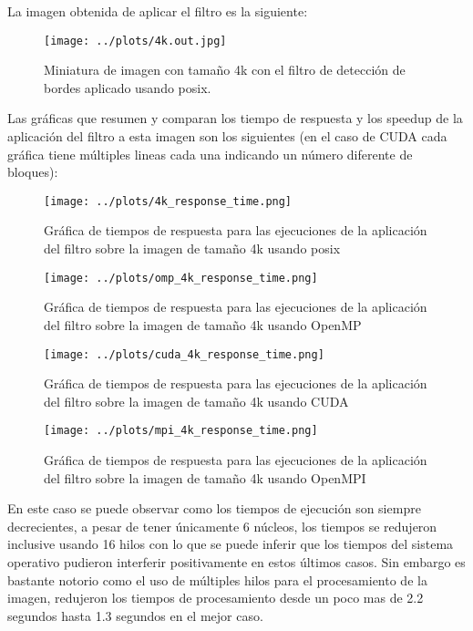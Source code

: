La imagen obtenida de aplicar el filtro es la siguiente:

\begin{figure}[H]
    \centering
    \texttt{[image: ../plots/4k.out.jpg]}
    \caption{Miniatura de imagen con tamaño 4k con el filtro de detección de bordes aplicado usando posix.}
\end{figure}

Las gráficas que resumen y comparan los tiempo de respuesta y los speedup de la aplicación del filtro a esta imagen son los siguientes (en el caso de CUDA cada gráfica tiene múltiples lineas cada una indicando un número diferente de bloques):

\begin{figure}[H]
    \centering
    \texttt{[image: ../plots/4k\_response\_time.png]}
    \caption{Gráfica de tiempos de respuesta para las ejecuciones de la aplicación del filtro sobre la imagen de tamaño 4k usando posix}
\end{figure}

\begin{figure}[H]
    \centering
    \texttt{[image: ../plots/omp\_4k\_response\_time.png]}
    \caption{Gráfica de tiempos de respuesta para las ejecuciones de la aplicación del filtro sobre la imagen de tamaño 4k usando OpenMP}
\end{figure}

\begin{figure}[H]
    \centering
    \texttt{[image: ../plots/cuda\_4k\_response\_time.png]}
    \caption{Gráfica de tiempos de respuesta para las ejecuciones de la aplicación del filtro sobre la imagen de tamaño 4k usando CUDA}
\end{figure}

\begin{figure}[H]
    \centering
    \texttt{[image: ../plots/mpi\_4k\_response\_time.png]}
    \caption{Gráfica de tiempos de respuesta para las ejecuciones de la aplicación del filtro sobre la imagen de tamaño 4k usando OpenMPI}
\end{figure}

En este caso se puede observar como los tiempos de ejecución son siempre decrecientes, a pesar de tener únicamente 6 núcleos, los tiempos se redujeron inclusive usando 16 hilos con lo que se puede inferir que los tiempos del sistema operativo pudieron interferir positivamente en estos últimos casos. Sin embargo es bastante notorio como el uso de múltiples hilos para el procesamiento de la imagen, redujeron los tiempos de procesamiento desde un poco mas de 2.2 segundos hasta 1.3 segundos en el mejor caso.

